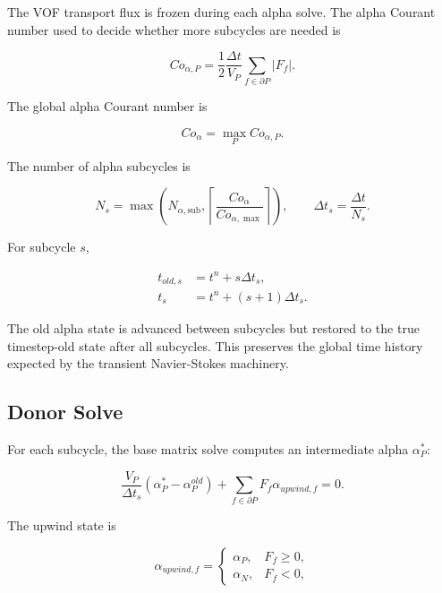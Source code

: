 \documentclass[11pt]{article}
\begin{document}
The VOF transport flux is frozen during each alpha solve.  The alpha Courant
number used to decide whether more subcycles are needed is

\begin{equation}
  Co_{\alpha,P}
  =
  \frac{1}{2}
  \frac{\Delta t}{V_P}
  \sum_{f\in\partial P}
  |F_f|.
  \label{eq:alpha-courant}
\end{equation}

The global alpha Courant number is

\begin{equation}
  Co_\alpha=\max_P Co_{\alpha,P}.
\end{equation}

The number of alpha subcycles is

\begin{equation}
  N_s
  =
  \max
  \left(
    N_{\alpha,\mathrm{sub}},
    \left\lceil
      \frac{Co_\alpha}{Co_{\alpha,\max}}
    \right\rceil
  \right),
  \qquad
  \Delta t_s=\frac{\Delta t}{N_s}.
  \label{eq:subcycles}
\end{equation}

For subcycle \(s\),

\begin{align}
  t_{old,s}&=t^n+s\Delta t_s,\\
  t_s&=t^n+(s+1)\Delta t_s.
\end{align}

The old alpha state is advanced between subcycles but restored to the true
timestep-old state after all subcycles.  This preserves the global time
history expected by the transient Navier-Stokes machinery.

\subsection{Donor Solve}

For each subcycle, the base matrix solve computes an intermediate alpha
\(\alpha_P^*\):

\begin{equation}
  \frac{V_P}{\Delta t_s}
  \left(\alpha_P^*-\alpha_P^{old}\right)
  +
  \sum_{f\in\partial P}
  F_f\alpha_{upwind,f}
  =
  0.
  \label{eq:alpha-donor}
\end{equation}

The upwind state is

\begin{equation}
  \alpha_{upwind,f}
  =
  \begin{cases}
    \alpha_P, & F_f\ge 0,\\
    \alpha_N, & F_f<0,
  \end{cases}
  \label{eq:upwind-alpha}
\end{equation}
\end{document}
